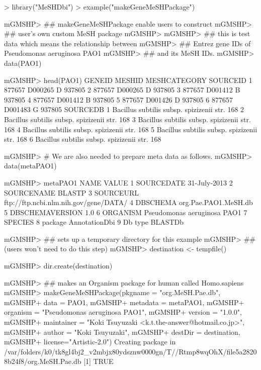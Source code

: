 \documentclass[11pt]{article}
\begin{document}
\begin{center}
\begin{Schunk}
\begin{Sinput}
> library("MeSHDbi")
> example("makeGeneMeSHPackage")
\end{Sinput}
\begin{Soutput}
mGMSHP> ## makeGeneMeSHPackage enable users to construct
mGMSHP> ## user's own custom MeSH package
mGMSHP> 
mGMSHP> ## this is test data which means the relationship between
mGMSHP> ## Entrez gene IDs of Pseudomonas aeruginosa PAO1
mGMSHP> ## and its MeSH IDs.
mGMSHP> data(PAO1)

mGMSHP> head(PAO1)
  GENEID  MESHID MESHCATEGORY SOURCEID
1 877657 D000265            D   937805
2 877657 D000265            D   937805
3 877657 D001412            B   937805
4 877657 D001412            B   937805
5 877657 D001426            D   937805
6 877657 D001483            G   937805
                                      SOURCEDB
1 Bacillus subtilis subsp. spizizenii str. 168
2 Bacillus subtilis subsp. spizizenii str. 168
3 Bacillus subtilis subsp. spizizenii str. 168
4 Bacillus subtilis subsp. spizizenii str. 168
5 Bacillus subtilis subsp. spizizenii str. 168
6 Bacillus subtilis subsp. spizizenii str. 168

mGMSHP> # We are also needed to prepare meta data as follows.
mGMSHP> data(metaPAO1)

mGMSHP> metaPAO1
             NAME                                 VALUE
1      SOURCEDATE                          31-July-2013
2      SOURCENAME                                BLASTP
3       SOURCEURL ftp://ftp.ncbi.nlm.nih.gov/gene/DATA/
4        DBSCHEMA                  org.Pae.PAO1.MeSH.db
5 DBSCHEMAVERSION                                   1.0
6        ORGANISM           Pseudomonas aeruginosa PAO1
7         SPECIES                                      
8         package                         AnnotationDbi
9         Db type                               BLASTDb

mGMSHP> ## sets up a temporary directory for this example
mGMSHP> ## (users won't need to do this step)
mGMSHP> destination <- tempfile()

mGMSHP> dir.create(destination)

mGMSHP> ## makes an Organism package for human called Homo.sapiens
mGMSHP> makeGeneMeSHPackage(pkgname = "org.MeSH.Pae.db",
mGMSHP+ 					data = PAO1,
mGMSHP+           metadata = metaPAO1,
mGMSHP+ 					organism = "Pseudomonas aeruginosa PAO1",
mGMSHP+ 					version = "1.0.0",
mGMSHP+ 					maintainer = "Koki Tsuyuzaki <k.t.the-answer@hotmail.co.jp>",
mGMSHP+ 					author = "Koki Tsuyuzaki",
mGMSHP+ 					destDir = destination,
mGMSHP+ 					license="Artistic-2.0")
Creating package in /var/folders/k0/tk8gl4bj2_v2mbjx80ydsznw0000gn/T//Rtmp8wqOhX/file5a28208b24f8/org.MeSH.Pae.db 
[1] TRUE
\end{Soutput}
\end{Schunk}
\end{center}
\end{document}
